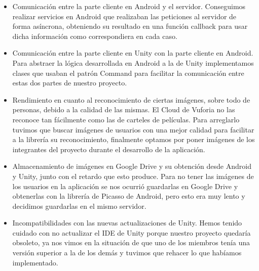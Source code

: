 \begin{itemize}
    \item Comunicación entre la parte cliente en Android y el servidor. Conseguimos realizar servicios en Android que realizaban las peticiones al servidor de forma asíncrona, obteniendo su resultado en una función callback para usar dicha información como correspondiera en cada caso.
    \item Comunicación entre la parte cliente en Unity con la parte cliente en Android. Para abstraer la lógica desarrollada en Android a la de Unity implementamos clases que usaban el patrón Command para facilitar la comunicación entre estas dos partes de nuestro proyecto.
    \item Rendimiento en cuanto al reconocimiento de ciertas imágenes, sobre todo de personas, debido a la calidad de las mismas. El Cloud de Vuforia no las reconoce tan fácilmente como las de carteles de películas. Para arreglarlo tuvimos que buscar imágenes de usuarios con una mejor calidad para facilitar a la librería su reconocimiento, finalmente optamos por poner imágenes de los integrantes del proyecto durante el desarrollo de la aplicación.
    \item Almacenamiento de imágenes en Google Drive y su obtención desde Android y Unity, junto con el retardo que esto produce. Para no tener las imágenes de los usuarios en la aplicación se nos ocurrió guardarlas en Google Drive y obtenerlas con la librería de Picasso de Android, pero esto era muy lento y decidimos guardarlas en el mismo servidor.
    \item Incompatibilidades con las nuevas actualizaciones de Unity. Hemos tenido cuidado con no actualizar el IDE de Unity porque nuestro proyecto quedaría obsoleto, ya nos vimos en la situación de que uno de los miembros tenía una versión superior a la de los demás y tuvimos que rehacer lo que habíamos implementado.
\end{itemize}